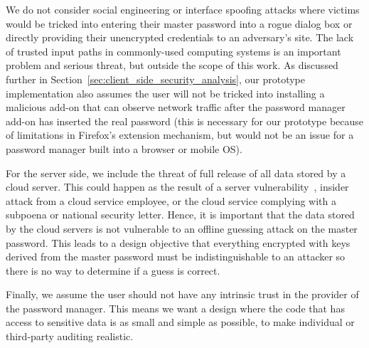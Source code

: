 We do not consider social engineering or interface spoofing attacks where victims would be tricked into entering their master password into a rogue dialog box or directly providing their unencrypted credentials to an adversary's site.  The lack of trusted input paths in commonly-used computing systems is an important problem and serious threat, but outside the scope of this work.  As discussed further in Section~\ref{sec:client_side_security_analysis}, our prototype implementation also assumes the user will not be tricked into installing a malicious add-on that can observe network traffic after the password manager add-on has inserted the real password (this is necessary for our prototype because of limitations in Firefox's extension mechanism, but would not be an issue for a password manager built into a browser or mobile OS).

For the server side, we include the threat of full release of all data stored by a cloud server. This could happen as the result of a server vulnerability~\cite{gasti2012security}, insider attack from a cloud service employee, or the cloud service complying with a subpoena or national security letter.  Hence, it is important that the data stored by the cloud servers is not vulnerable to an offline guessing attack on the master password. This leads to a design objective that everything encrypted with keys derived from the master password must be indistinguishable to an attacker so there is no way to determine if a guess is correct.

Finally, we assume the user should not have any intrinsic trust in the provider of the password manager. This means we want a design where the code that has access to sensitive data is as small and simple as possible, to make individual or third-party auditing realistic. 

